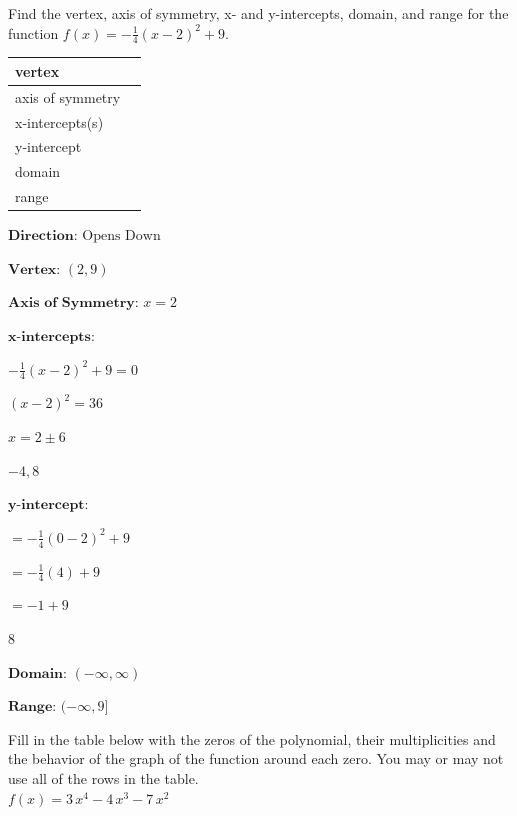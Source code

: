 \documentclass[addpoints]{exam}
\begin{document}
\begin{questions}
\question[5]
Find the vertex, axis of symmetry, x- and y-intercepts, domain, and range for the function \(\displaystyle{ f(x) = -\frac{1}{4}(x - 2)^2 +9 }\).\\

\renewcommand{\arraystretch}{3}
	\begin{tabular}{|l|l|}
		\hline
		vertex           & \hspace{175px}  \\ \hline
		axis of symmetry &  \\ \hline
		x-intercepts(s)  &  \\ \hline
		y-intercept      &  \\ \hline
		domain           &  \\ \hline
		range            &  \\ \hline
	\end{tabular}
    
\begin{solution}
\(\textbf{Direction: } \text{Opens Down}\) 

 \(\textbf{Vertex: } (2, 9)\) 

 \(\textbf{Axis of Symmetry: } x = 2\) 

 \(\textbf{x-intercepts:}\) 

 \(-\frac{1}{4}(x - 2)^2 +9 = 0\) 

 \((x - 2)^2 = 36\) 

 \(x = 2 \pm 6\) 

 \(\boxed{ -4, 8 }\) 

 \(\textbf{y-intercept:}\) 

 \(= -\frac{1}{4}(0 - 2)^2 +9\) 

 \(= -\frac{1}{4}(4) +9\) 

 \(= -1 +9\) 

 \(\boxed{ 8 }\) 

 \(\textbf{Domain: } (-\infty, \infty)\) 

 \(\textbf{Range: } (-\infty, 9]\)
\end{solution}
\newpage

\question[5] Fill in the table below with the zeros of the polynomial, their multiplicities and the behavior of the graph of the function around each zero. You may or may not use all of the rows in the table.\\

\(\displaystyle{ f(x) = 3 \, x^{4} - 4 \, x^{3} - 7 \, x^{2} }\)


\end{questions}
\end{document}
